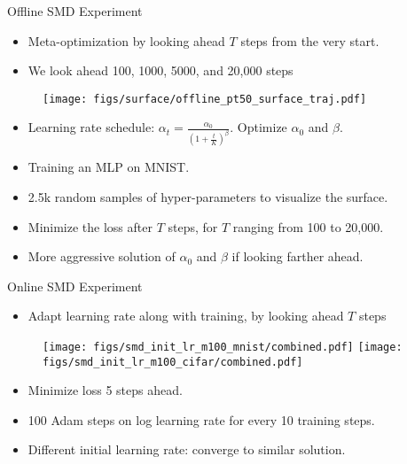 \documentclass[final,t]{beamer}
\begin{document}
\begin{frame}{}
\begin{columns}[t]
\begin{column}{.32\linewidth}
    \begin{exampleblock}{Offline SMD Experiment}
    \begin{itemize}
	\item Meta-optimization by looking ahead $T$ steps from the very start.
    \item We look ahead 100, 1000, 5000, and 20,000 steps
    \end{itemize}
        \begin{figure}[t!]
        \centering
     \texttt{[image: figs/surface/offline\_pt50\_surface\_traj.pdf]}
        \label{fig:sgd_best_decay}
        \end{figure}
        \begin{itemize}
        	\item Learning rate schedule:
            $\alpha_t = \frac{\alpha_0}{(1 + \frac{t}{K})^\beta}$. Optimize $\alpha_0$ and $\beta$.
            \item Training an MLP on MNIST.
            \item 2.5k random samples of hyper-parameters to visualize the surface.
            \item Minimize the loss after $T$ steps, for $T$ ranging from 100 to 20,000.
            \item More aggressive solution of $\alpha_0$ and $\beta$ if looking farther ahead.
        \end{itemize}
    \end{exampleblock}
    \begin{exampleblock}{Online SMD Experiment}
    \begin{itemize}
	\item Adapt learning rate along with training, by looking ahead $T$ steps
    \end{itemize}
        \begin{figure}
        \centering\texttt{[image: figs/smd\_init\_lr\_m100\_mnist/combined.pdf]}
	\quad
  \texttt{[image: figs/smd\_init\_lr\_m100\_cifar/combined.pdf]}
        \label{fig:smd_init_lr}
        \end{figure}
        \vspace{-0.2in}
        \begin{itemize}
        	\item Minimize loss 5 steps ahead.
            \item 100 Adam steps on log learning rate for every 10 training steps.
            \item Different initial learning rate: converge to similar solution.

\end{itemize}
\end{exampleblock}
\end{column}
\end{columns}
\end{frame}
\end{document}
